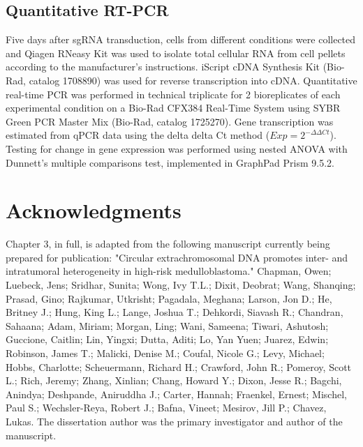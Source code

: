 \subsection{Quantitative RT-PCR}
Five days after sgRNA transduction, cells from different conditions were collected and Qiagen RNeasy Kit was used to isolate total cellular RNA from cell pellets according to the manufacturer's instructions. iScript cDNA Synthesis Kit (Bio-Rad, catalog 1708890) was used for reverse transcription into cDNA. Quantitative real-time PCR was performed in technical triplicate for 2 bioreplicates of each experimental condition on a Bio-Rad CFX384 Real-Time System using SYBR Green PCR Master Mix (Bio-Rad, catalog 1725270). 
Gene transcription was estimated from qPCR data using the delta delta Ct method ($Exp = 2^{-\Delta \Delta Ct}$). Testing for change in gene expression was performed using nested ANOVA with Dunnett's multiple comparisons test, implemented in GraphPad Prism 9.5.2.

\section{Acknowledgments}

\ackfunding

\par Chapter 3, in full, is adapted from the following manuscript currently being prepared for publication: "Circular extrachromosomal DNA promotes inter- and intratumoral heterogeneity in high-risk medulloblastoma." Chapman, Owen; Luebeck, Jens; Sridhar, Sunita; Wong, Ivy T.L.; Dixit, Deobrat; Wang, Shanqing; Prasad, Gino; Rajkumar, Utkrisht; Pagadala, Meghana; Larson, Jon D.; He, Britney J.; Hung, King L.; Lange, Joshua T.; Dehkordi, Siavash R.; Chandran, Sahaana; Adam, Miriam; Morgan, Ling; Wani, Sameena; Tiwari, Ashutosh; Guccione, Caitlin; Lin, Yingxi; Dutta, Aditi; Lo, Yan Yuen; Juarez, Edwin; Robinson, James T.; Malicki, Denise M.; Coufal, Nicole G.; Levy, Michael; Hobbs, Charlotte; Scheuermann, Richard H.; Crawford, John R.; Pomeroy, Scott L.; Rich, Jeremy; Zhang, Xinlian; Chang, Howard Y.; Dixon, Jesse R.; Bagchi, Anindya; Deshpande, Aniruddha J.; Carter, Hannah; Fraenkel, Ernest; Mischel, Paul S.; Wechsler-Reya, Robert J.; Bafna, Vineet; Mesirov, Jill P.; Chavez, Lukas. The dissertation author was the primary investigator and author of the manuscript.